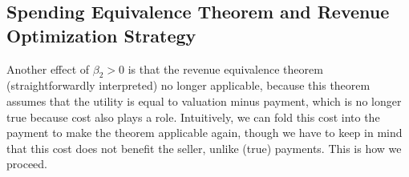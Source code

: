 \subsection{Spending Equivalence Theorem and Revenue Optimization Strategy}

Another effect of $\beta_2>0$ is that the revenue equivalence theorem
(straightforwardly interpreted) no longer applicable, because this theorem 
assumes
that the utility is equal to valuation minus payment, which is no longer
true because cost also plays a role.  Intuitively, we can fold this cost
into the payment to make the theorem applicable again, though we have to
keep in mind that this cost does not benefit the seller, unlike (true)
payments.  This is how we proceed.





